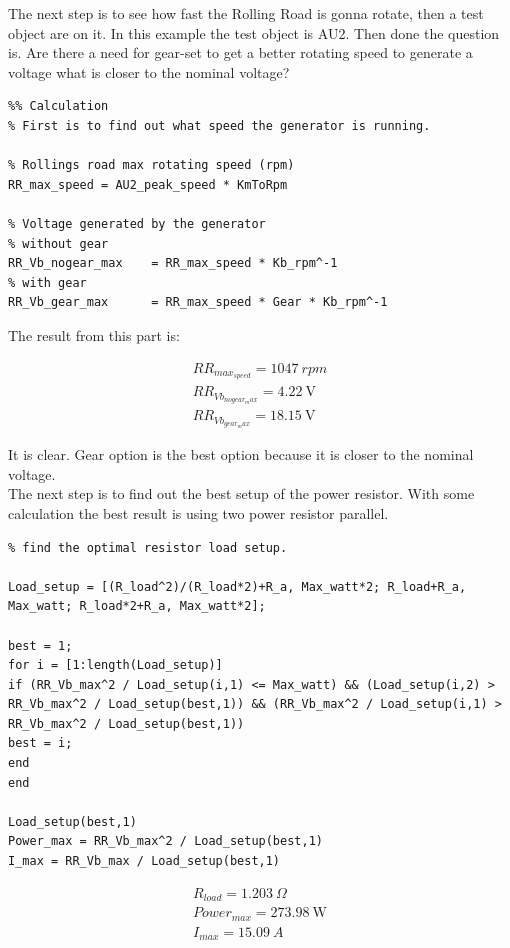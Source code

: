 The next step is to see how fast the Rolling Road is gonna rotate, then a test object are on it. In this example the test object is AU2. Then done the question is. Are there a need for gear-set to get a better rotating speed to generate a voltage what is closer to the nominal voltage?

\lstset{language=MATLAB}
\begin{lstlisting}
%% Calculation
% First is to find out what speed the generator is running.

% Rollings road max rotating speed (rpm)
RR_max_speed = AU2_peak_speed * KmToRpm 

% Voltage generated by the generator
% without gear
RR_Vb_nogear_max    = RR_max_speed * Kb_rpm^-1
% with gear
RR_Vb_gear_max      = RR_max_speed * Gear * Kb_rpm^-1
\end{lstlisting}

The result from this part is:

\begin{equation}
\begin{split}
	RR_{max_{speed}} = \SI{1047}{rpm}\\
	RR_{Vb_{nogear_max}} = \SI{4.22}{\volt}\\
	RR_{Vb_{gear_max}} = \SI{18.15}{\volt}
\end{split}
\end{equation}

It is clear. Gear option is the best option because it is closer to the nominal voltage.\\

The next step is to find out the best setup of the power resistor. With some calculation the best result is using two power resistor parallel. 

\lstset{language=MATLAB}
\begin{lstlisting}
% find the optimal resistor load setup.

Load_setup = [(R_load^2)/(R_load*2)+R_a, Max_watt*2; R_load+R_a, Max_watt; R_load*2+R_a, Max_watt*2];

best = 1;
for i = [1:length(Load_setup)]
if (RR_Vb_max^2 / Load_setup(i,1) <= Max_watt) && (Load_setup(i,2) > RR_Vb_max^2 / Load_setup(best,1)) && (RR_Vb_max^2 / Load_setup(i,1) > RR_Vb_max^2 / Load_setup(best,1))
best = i; 
end
end

Load_setup(best,1)
Power_max = RR_Vb_max^2 / Load_setup(best,1)
I_max = RR_Vb_max / Load_setup(best,1)
\end{lstlisting}


\begin{equation}
	\begin{split}
		R_{load} = \SI{1.203}{\Omega}\\
		Power_{max} = \SI{273.98}{\watt}\\
		I_{max} = \SI{15.09}{A}
	\end{split}
\end{equation}

